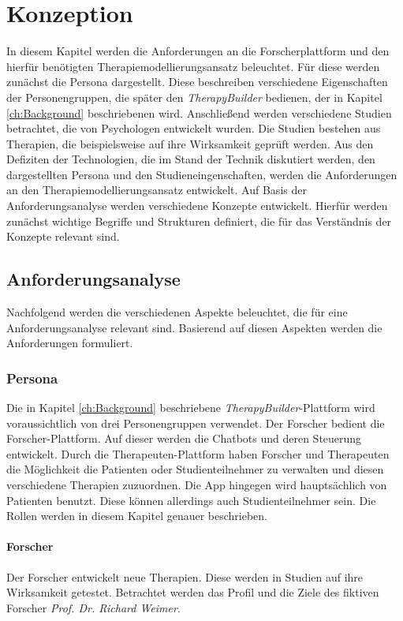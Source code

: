 \chapter{Konzeption}
\label{ch:Design}
In diesem Kapitel werden die Anforderungen an die Forscherplattform und den hierfür benötigten Therapiemodellierungsansatz beleuchtet. Für diese werden zunächst die Persona dargestellt. Diese beschreiben verschiedene Eigenschaften der Personengruppen, die später den \emph{TherapyBuilder} bedienen, der in Kapitel \ref{ch:Background}  beschriebenen wird. Anschließend werden verschiedene Studien betrachtet, die von Psychologen entwickelt wurden. Die Studien bestehen aus Therapien, die beispielsweise auf ihre Wirksamkeit geprüft werden. Aus den Defiziten der Technologien, die im Stand der Technik diskutiert werden, den dargestellten Persona und den Studieneingenschaften, werden die Anforderungen an den Therapiemodellierungsansatz entwickelt. Auf Basis der Anforderungsanalyse werden verschiedene Konzepte entwickelt. Hierfür werden zunächst wichtige Begriffe und Strukturen definiert, die für das Verständnis der Konzepte relevant sind.


\section{Anforderungsanalyse}
Nachfolgend werden die verschiedenen Aspekte beleuchtet, die für eine Anforderungsanalyse relevant sind. Basierend auf diesen Aspekten werden die Anforderungen formuliert.

\subsection{Persona}
Die in Kapitel \ref{ch:Background} beschriebene \emph{TherapyBuilder}-Plattform wird voraussichtlich von drei Personengruppen verwendet. Der Forscher bedient die Forscher-Plattform. Auf dieser werden die Chatbots und deren Steuerung entwickelt. Durch die Therapeuten-Plattform haben Forscher und Therapeuten die Möglichkeit die Patienten oder Studienteilnehmer zu verwalten und diesen verschiedene Therapien zuzuordnen. Die App hingegen wird hauptsächlich von Patienten benutzt. Diese können allerdings auch Studienteilnehmer sein. Die Rollen werden in diesem Kapitel genauer beschrieben.

\subsubsection{Forscher}
Der Forscher entwickelt neue Therapien. Diese werden in Studien auf ihre Wirksamkeit getestet. Betrachtet werden das Profil und die Ziele des fiktiven Forscher \emph{Prof. Dr. Richard Weimer}. 


